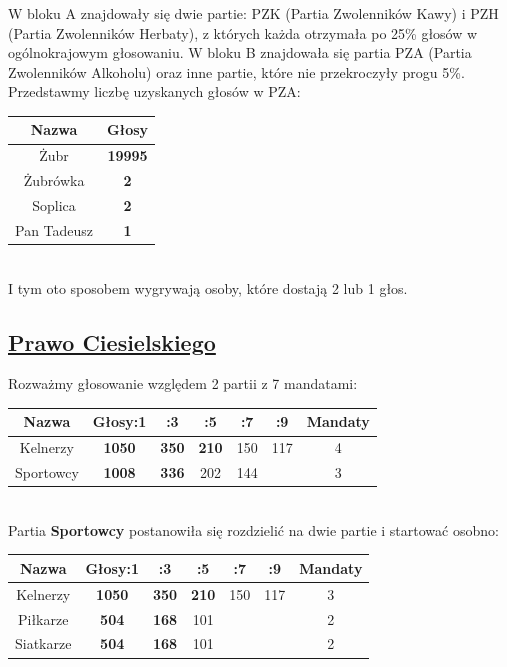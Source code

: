 \documentclass[12pt,a4paper]{article}
\theoremstyle{break}
\begin{document}
W bloku A znajdowały się dwie partie: PZK (Partia Zwolenników Kawy) i PZH (Partia Zwolenników Herbaty), z których każda otrzymała po 25\% głosów w ogólnokrajowym głosowaniu. W bloku B znajdowała się partia PZA (Partia Zwolenników Alkoholu) oraz inne partie, które nie przekroczyły progu 5\%. Przedstawmy liczbę uzyskanych głosów w PZA:

\begin{tabular}{|c|c|}\hline
	Nazwa       & Głosy\\\hline
	Żubr        & \textbf{19995}\\\hline
	Żubrówka    & \textbf{2}\\\hline
	Soplica     & \textbf{2}\\\hline
	Pan Tadeusz & \textbf{1}\\\hline
\end{tabular}\\

I tym oto sposobem wygrywają osoby, które dostają 2 lub 1 głos.

\subsection{\href{http://www.racjonalista.pl/kk.php/s,9848/k,3}{Prawo Ciesielskiego}}

Rozważmy głosowanie względem 2 partii z 7 mandatami:

\begin{tabular}{|c|c|c|c|c|c|c|}\hline
	Nazwa        & Głosy:1 & :3 & :5  & :7  & :9  & Mandaty\\\hline
	Kelnerzy     & \textbf{1050} & \textbf{350} & \textbf{210} & 150 & 117  & 4\\\hline
	Sportowcy    & \textbf{1008} & \textbf{336} & 202  & 144 &      & 3\\\hline
\end{tabular}\\

Partia \textbf{Sportowcy} postanowiła się rozdzielić na dwie partie i startować osobno:

\begin{tabular}{|c|c|c|c|c|c|c|}\hline
	Nazwa        & Głosy:1 & :3 & :5  & :7  & :9  & Mandaty\\\hline
	Kelnerzy     & \textbf{1050} & \textbf{350} & \textbf{210} & 150 & 117  & 3\\\hline
	Piłkarze     & \textbf{504}  & \textbf{168} & 101  &     &      & 2\\\hline
	Siatkarze    & \textbf{504}  & \textbf{168} & 101  &     &      & 2\\\hline
\end{tabular}\\
\end{document}
